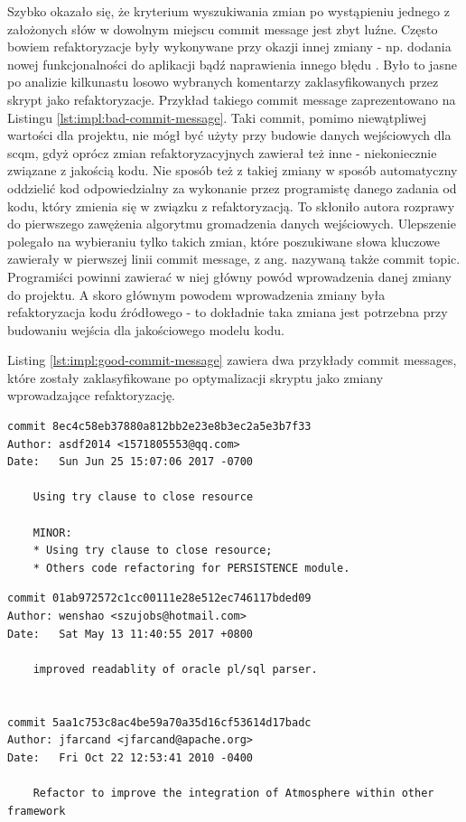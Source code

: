 \documentclass[12pt]{report}
\begin{document}
Szybko okazało się, że kryterium wyszukiwania zmian po wystąpieniu jednego z założonych słów w dowolnym miejscu commit message jest zbyt luźne. Często bowiem refaktoryzacje były wykonywane przy okazji innej zmiany - np. dodania nowej funkcjonalności do aplikacji bądź naprawienia innego błędu . Było to jasne po analizie kilkunastu losowo wybranych komentarzy zaklasyfikowanych przez skrypt jako refaktoryzacje. Przykład takiego commit message zaprezentowano na Listingu \ref{lst:impl:bad-commit-message}. Taki commit, pomimo niewątpliwej wartości dla projektu, nie mógł być użyty przy budowie danych wejściowych dla \gls{scqm}, gdyż oprócz zmian refaktoryzacyjnych zawierał też inne - niekoniecznie związane z jakością kodu. Nie sposób też z takiej zmiany w sposób automatyczny oddzielić kod odpowiedzialny za wykonanie przez programistę danego zadania od kodu, który zmienia się w związku z refaktoryzacją. To skłoniło autora rozprawy do pierwszego zawężenia algorytmu gromadzenia danych wejściowych. Ulepszenie polegało na wybieraniu tylko takich zmian, które poszukiwane słowa kluczowe zawierały w pierwszej linii commit message, z ang. nazywaną także commit topic. Programiści powinni zawierać w niej główny powód wprowadzenia danej zmiany do projektu. A skoro głównym powodem wprowadzenia zmiany była refaktoryzacja kodu źródłowego - to dokładnie taka zmiana jest potrzebna przy budowaniu wejścia dla jakościowego modelu kodu.

Listing \ref{lst:impl:good-commit-message} zawiera dwa przykłady commit messages, które zostały zaklasyfikowane po optymalizacji skryptu jako zmiany wprowadzające refaktoryzację.

\begin{lstlisting}[frame=single,caption={Przykład komentarza do zmiany, który został niepoprawnie sklasyfikowany jako refaktoryzacja kodu},captionpos=b,label={lst:impl:bad-commit-message}]
commit 8ec4c58eb37880a812bb2e23e8b3ec2a5e3b7f33
Author: asdf2014 <1571805553@qq.com>
Date:   Sun Jun 25 15:07:06 2017 -0700

    Using try clause to close resource

    MINOR:
    * Using try clause to close resource;
    * Others code refactoring for PERSISTENCE module.
\end{lstlisting}

\begin{lstlisting}[frame=single,caption={Przykład komentarzy do zmian, które zostały sklasyfikowane jako refaktoryzacje kodu (po optymalizacji)},captionpos=b,label={lst:impl:good-commit-message}]
commit 01ab972572c1cc00111e28e512ec746117bded09
Author: wenshao <szujobs@hotmail.com>
Date:   Sat May 13 11:40:55 2017 +0800

    improved readablity of oracle pl/sql parser.


commit 5aa1c753c8ac4be59a70a35d16cf53614d17badc
Author: jfarcand <jfarcand@apache.org>
Date:   Fri Oct 22 12:53:41 2010 -0400

    Refactor to improve the integration of Atmosphere within other framework
\end{lstlisting}
\end{document}
